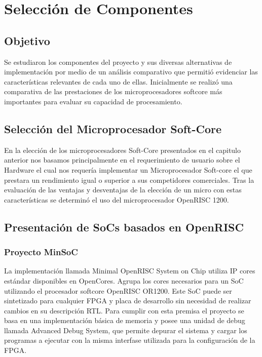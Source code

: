 \chapter{Selección de Componentes}

\section{Objetivo}
			Se estudiaron los componentes del proyecto y sus diversas alternativas de implementación por medio de un análisis comparativo que permitió evidenciar
			las características relevantes de cada uno de ellas. Inicialmente se realizó una comparativa de las prestaciones de los microprocesadores softcore
			más importantes para evaluar su capacidad de procesamiento.

\section{Selección del Microprocesador Soft-Core}


En la elección de los microprocesadores Soft-Core presentados en el capitulo anterior nos basamos principalmente en el requerimiento de usuario sobre el Hardware el cual nos requería implementar un Microprocesador Soft-core el que prestara un rendimiento igual o superior a sus competidores comerciales. Tras la evaluación de las ventajas y desventajas de la elección de un micro con estas características se determinó el uso del microprocesador OpenRISC 1200. 	

		    			
\section{Presentación de SoCs basados en OpenRISC}
				
				\subsection{Proyecto MinSoC}
				La implementación llamada Minimal OpenRISC System on Chip utiliza IP cores estándar disponibles en OpenCores. Agrupa los cores necesarios para un SoC utilizando el procesador softcore OpenRISC OR1200. Este SoC puede ser sintetizado para cualquier FPGA y placa de desarrollo sin necesidad de realizar cambios en su descripción RTL. Para cumplir con esta premisa el proyecto se basa en una implementación básica de memoria y posee una unidad de debug llamada Advanced Debug System, que permite depurar el sistema y cargar los programas a ejecutar con la misma interfase utilizada para la configuración de la FPGA.		

